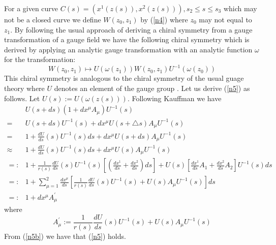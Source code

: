 \documentclass[a4paper,a4paper]{article}
\newtheorem{theorem}{Theorem}
\begin{document}
For a given curve $C(s)=(x^1(z(s)), x^2(z(s))), s_2 \leq s\leq s_3$ which may not be a closed curve
we define $W(z_0, z_1)$ by (\ref{n4}) 
where $z_0$ may not equal to $z_1$.
By following the usual approach of deriving a chiral symmetry from a gauge transformation of a gauge field
we have the following chiral symmetry
which is derived by applying an analytic gauge transformation with an analytic function $\omega$
for the transformation:
\begin{equation}
W(z_0, z_1) \mapsto U(\omega(z_1))
W(z_0, z_1)U^{-1}(\omega(z_0))
\label{n5}
\end{equation}
This chiral symmetry is analogous to the chiral symmetry
of the usual guage theory where $U$ denotes an element of the gauge group \cite{Kau}.
Let us derive (\ref{n5}) as follows.
Let $U(s):= U(\omega(z(s)))$.
Following Kauffman \cite{Kau} we have
\begin{equation}
\begin{array}{rl}
& U(s+ ds)(1+ dx^{\mu}A_{\mu})U^{-1}(s)\\
=& U(s+ ds)U^{-1}(s)
+ dx^{\mu}U(s+\triangle s)A_{\mu}U^{-1}(s) \\
= & 1+ \frac{dU}{ds}(s)U^{-1}(s)ds
  + dx^{\mu}U(s+ ds)A_{\mu}U^{-1}(s) \\
\approx & 1+ \frac{dU}{ds}(s)U^{-1}(s)ds
+ dx^{\mu}U(s)A_{\mu}U^{-1}(s) \\
=: & 1+ \frac{1}{r(s)}\frac{dU}{ds}(s)U^{-1}(s)
[(\frac{dx^1}{ds}+\frac{dx^2}{ds})ds]
 + U(s)[\frac{dx^1}{ds}A_1+\frac{dx^2}{ds}A_2]U^{-1}(s)ds\\

=: & 1 + \sum_{\mu=1}^2\frac{dx^{\mu}}{ds}
    [\frac{1}{r(s)}\frac{dU}{ds}(s)U^{-1}(s)+
     U(s)A_{\mu}U^{-1}(s)]ds
    \\
=:& 1 + dx^{\mu}A_{\mu}^{\prime}
\end{array}
\label{n5b}
\end{equation}
where 
\begin{equation}
A_{\mu}^{\prime}
:=\frac{1}{r(s)}\frac{dU}{ds}(s)U^{-1}(s)+
  U(s)A_{\mu}U^{-1}(s)
\label{n5c}
\end{equation}
From (\ref{n5b}) we have that (\ref{n5}) holds.
\end{document}
